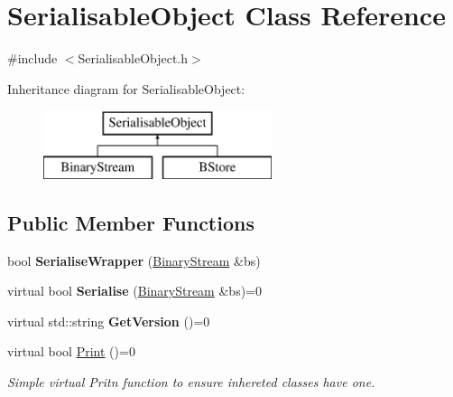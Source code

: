 \hypertarget{classSerialisableObject}{\section{Serialisable\-Object Class Reference}
\label{classSerialisableObject}
}


{\ttfamily \#include $<$Serialisable\-Object.\-h$>$}

Inheritance diagram for Serialisable\-Object\-:\begin{figure}[H]
\begin{center}
\leavevmode
\includegraphics[height=2.000000cm]{classSerialisableObject}
\end{center}
\end{figure}
\subsection*{Public Member Functions}
\begin{DoxyCompactItemize}
\item 
\hypertarget{classSerialisableObject_a3783b1798068a4bdc58fe6cdf7f7929b}{bool {\bfseries Serialise\-Wrapper} (\hyperlink{classBinaryStream}{Binary\-Stream} \&bs)}\label{classSerialisableObject_a3783b1798068a4bdc58fe6cdf7f7929b}

\item 
\hypertarget{classSerialisableObject_ab8916a102bc94764f023b1713fb040db}{virtual bool {\bfseries Serialise} (\hyperlink{classBinaryStream}{Binary\-Stream} \&bs)=0}\label{classSerialisableObject_ab8916a102bc94764f023b1713fb040db}

\item 
\hypertarget{classSerialisableObject_a345b21d2a7c869dedd96ad691fc602bd}{virtual std\-::string {\bfseries Get\-Version} ()=0}\label{classSerialisableObject_a345b21d2a7c869dedd96ad691fc602bd}

\item 
\hypertarget{classSerialisableObject_a9055c98969917d4c652eefdc924b6b75}{virtual bool \hyperlink{classSerialisableObject_a9055c98969917d4c652eefdc924b6b75}{Print} ()=0}\label{classSerialisableObject_a9055c98969917d4c652eefdc924b6b75}

\begin{DoxyCompactList}\small\item\em Simple virtual Pritn function to ensure inhereted classes have one. \end{DoxyCompactList}\end{DoxyCompactItemize}


